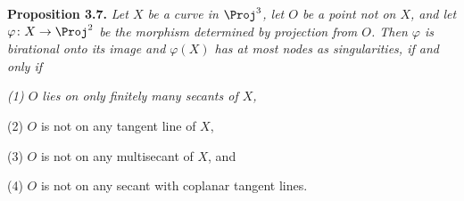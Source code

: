 {\medskip
\noindent\hypertarget{result-IV-3.7}{}\textbf{Proposition 3.7.} \emph{Let $X$ be a curve in $\Proj^3$, let $O$ be a point not on $X$, and let $\varphi\colon X\to\Proj^2$ be the morphism determined by projection from $O$. Then $\varphi$ is birational onto its image and $\varphi(X)$ has at most nodes as singularities, if and only if}
\par{\itshape\leftskip=11pt
\noindent\hypertarget{result-IV-3.7-1}{}(1) $O$ lies on only finitely many secants of $X$,

\noindent\hypertarget{result-IV-3.7-2}{}(2) $O$ is not on any tangent line of $X$,

\noindent\hypertarget{result-IV-3.7-3}{}(3) $O$ is not on any multisecant of $X$, and

\noindent\hypertarget{result-IV-3.7-4}{}(4) $O$ is not on any secant with coplanar tangent lines.\par}
}
